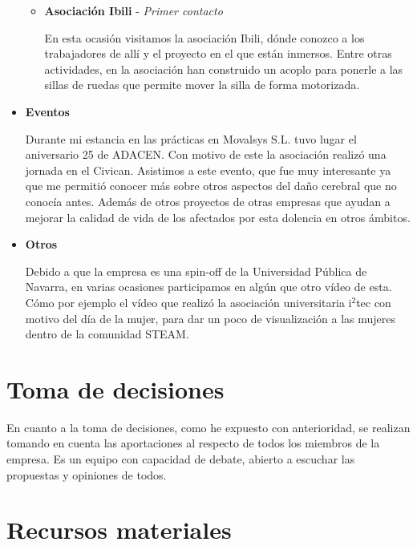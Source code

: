 \begin{itemize}
\begin{itemize}
					\item \textbf{Asociación Ibili} - \textit{Primer contacto} 
					
					\smallskip	
					En esta ocasión visitamos la asociación Ibili, dónde conozco a los trabajadores de allí y el proyecto en el que están inmersos. Entre otras actividades, en la asociación han construido un acoplo para ponerle a las sillas de ruedas que permite mover la silla de forma motorizada.
					\smallskip
					
				\end{itemize}
			\medskip

			\item \textbf{Eventos} 
			
			\smallskip
				Durante mi estancia en las prácticas en Movalsys S.L. tuvo lugar el aniversario 25 de ADACEN. Con motivo de este la asociación realizó una jornada en el Civican. Asistimos a este evento, que fue muy interesante ya que me permitió conocer más sobre otros aspectos del daño cerebral que no conocía antes. Además de otros proyectos de otras empresas que ayudan a mejorar la calidad de vida de los afectados por esta dolencia en otros ámbitos.
								
			\medskip
			
			\item \textbf{Otros} 
			
			\smallskip
			Debido a que la empresa es una spin-off de la Universidad Pública de Navarra, en varias ocasiones participamos en algún que otro vídeo de esta. Cómo por ejemplo el vídeo que realizó la asociación universitaria i$^{2}$tec con motivo del día de la mujer, para dar un poco de visualización a las mujeres dentro de la comunidad STEAM. 
			\medskip
		\end{itemize}
		
	
		
			
	
			
	\section{Toma de decisiones}
	
	
	En cuanto a la toma de decisiones, como he expuesto con anterioridad, se realizan tomando en cuenta las aportaciones al respecto de todos los miembros de la empresa. Es un equipo con capacidad de debate, abierto a escuchar las propuestas y opiniones de todos.

	
	
	\section{Recursos materiales}

